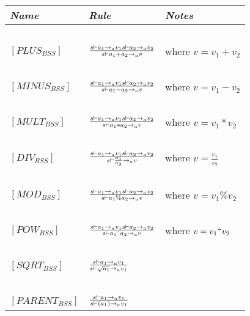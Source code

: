 \begin{table}[H]
	\begin{tabular}{|l|l|l|}
	\hline
	\emph{Name}			& \emph{Rule}																															& \emph{Notes} \\ \hline
			~			&															~																			& ~ \\
	$[PLUS_{BSS}]$		& $s \vdash a_{1} \rightarrow_{a} v_{1}  s \vdash a_{2} \rightarrow_{a} v_{2} \over s \vdash a_{1}+a_{2} \rightarrow_{a} v$ 			& where $v = v_{1}+v_{2}$ \\
			~			&															~																			& ~ \\
	$[MINUS_{BSS}]$		& $s \vdash a_{1} \rightarrow_{a} v_{1}  s \vdash a_{2} \rightarrow_{a} v_{2} \over s \vdash a_{1}-a_{2} \rightarrow_{a} v$ 			& where $v = v_{1}-v_{2}$ \\
			~			&															~																			& ~ \\
	$[MULT_{BSS}]$		& $s \vdash a_{1} \rightarrow_{a} v_{1}  s \vdash a_{2} \rightarrow_{a} v_{2} \over s \vdash a_{1}*a_{2} \rightarrow_{a} v$ 			& where $v = v_{1}*v_{2}$ \\
			~			&															~																			& ~ \\
	$[DIV_{BSS}]$		& $s \vdash a_{1} \rightarrow_{a} v_{1}  s \vdash a_{2} \rightarrow_{a} v_{2} \over s \vdash \frac{a_{1}}{a_{2}} \rightarrow_{a} v$ 	& where $v = \frac{v_{1}}{v_{2}}$ \\
			~			&																																		& ~ \\
	$[MOD_{BSS}]$		& $s \vdash a_{1} \rightarrow_{a} v_{1}  s \vdash a_{2} \rightarrow_{a} v_{2} \over s \vdash a_{1}\%a_{2} \rightarrow_{a} v$			& where $v = v_{1}\%v_{2}$ \\
			~			&															~																			& ~ \\
	$[POW_{BSS}]$		& $s \vdash a_{1} \rightarrow_{a} v_{1}  s \vdash a_{2} \rightarrow_{a} v_{2} \over s \vdash a_{1}\texttt{\^{}}a_{2} \rightarrow_{a} v$	& where $v = v_{1}\texttt{\^{}}v_{2}$ \\
			~			&															~																			& ~ \\
	$[SQRT_{BSS}]$		& $s \vdash a_{1} \rightarrow_{a} v_{1} \over s \vdash \sqrt{a_{1}} \rightarrow_{a} v_{1}$												& ~ \\
			~			&															~																			& ~ \\
	$[PARENT_{BSS}]$	& $s \vdash a_{1} \rightarrow_{a} v_{1} \over s \vdash (a_{1}) \rightarrow_{a} v_{1}$													& ~ \\

\end{tabular}
\end{table}
